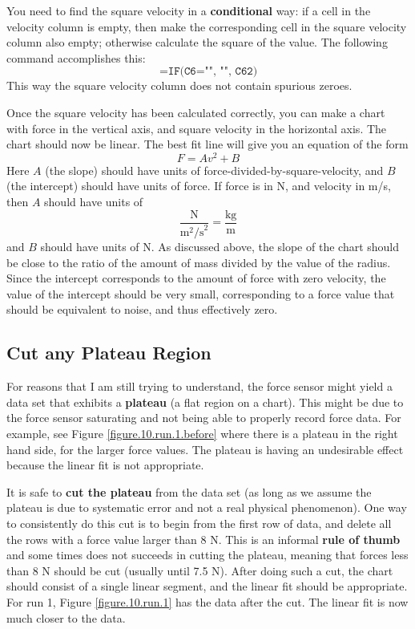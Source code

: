 You need to find the square velocity in a \textbf{conditional} way: if a cell in the velocity column is empty, then make the corresponding cell in the square velocity column also empty; otherwise calculate the square of the value. The following command accomplishes this:
\begin{equation}
    \texttt{=IF(C6="", "", C6\^{}2)}
\end{equation}
This way the square velocity column does not contain spurious zeroes.

Once the square velocity has been calculated correctly, you can make a chart with force in the vertical axis, and square velocity in the horizontal axis. The chart should now be linear. The best fit line will give you an equation of the form
\begin{equation}
    F = A v^{2} + B
\end{equation}
Here $A$ (the slope) should have units of force-divided-by-square-velocity, and $B$ (the intercept) should have units of force. If force is in N, and velocity in m/s, then $A$ should have units of
\begin{equation}
    \frac{\text{N}}{\text{m}^{2}\text{/s}^{2}} = \frac{\text{kg}}{\text{m}}
\end{equation}
and $B$ should have units of N. As discussed above, the slope of the chart should be close to the ratio of the amount of mass divided by the value of the radius. Since the intercept corresponds to the amount of force with zero velocity, the value of the intercept should be very small, corresponding to a force value that should be equivalent to noise, and thus effectively zero.
\subsection{Cut any Plateau Region}
For reasons that I am still trying to understand, the force sensor might yield a data set that exhibits a \textbf{plateau} (a flat region on a chart). This might be due to the force sensor saturating and not being able to properly record force data. For example, see Figure \ref{figure.10.run.1.before} where there is a plateau in the right hand side, for the larger force values. The plateau is having an undesirable effect because the linear fit is not appropriate.

It is safe to \textbf{cut the plateau} from the data set (as long as we assume the plateau is due to systematic error and not a real physical phenomenon). One way to consistently do this cut is to begin from the first row of data, and delete all the rows with a force value larger than 8 N. This is an informal \textbf{rule of thumb} and some times does not succeeds in cutting the plateau, meaning that forces less than 8 N should be cut (usually until 7.5 N). After doing such a cut, the chart should consist of a single linear segment, and the linear fit should be appropriate. For run 1, Figure \ref{figure.10.run.1} has the data after the cut. The linear fit is now much closer to the data.
